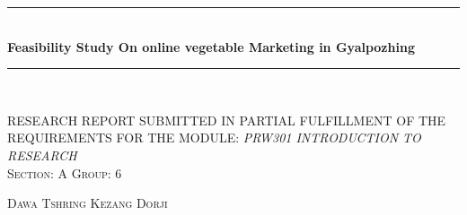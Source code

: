 \documentclass[12pt]{report}
\begin{document}
	
	
	\begin{titlepage}    %
	
		\newcommand{\HRule}{\rule{\linewidth}{0.5mm}} %
		
		\center %
		
		
		


		
		
		\HRule \\[0.6cm]
		{ \huge \bfseries Feasibility Study On online vegetable Marketing in
Gyalpozhing}\\[0.4cm] %
		\HRule \\[1.0cm]
		
		
		\begin{center} 
		\vspace{1cm}
		
		\uppercase{Research report submitted in partial fulfillment of the requirements for the module: \emph{PRW301 Introduction to Research}}\\[3cm] 
		
			{\textsc{Section: A }}  \hspace{4cm}		{\textsc{Group: 6 }} 
		\end{center}
		
		
		
		
		\begin{center} \large
			\medskip
			{\textsc{Dawa Tshring }}   	\quad
			{\textsc{Kezang Dorji }}     %
		\end{center}
		

\end{titlepage}
\end{document}
